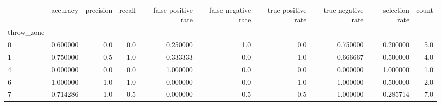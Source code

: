 \begin{tabular}{lrrrrrrrrr}
\toprule
{} &  accuracy &  precision &  recall &  false positive rate &  false negative rate &  true positive rate &  true negative rate &  selection rate &  count \\
throw\_zone &           &            &         &                      &                      &                     &                     &                 &        \\
\midrule
0          &  0.600000 &        0.0 &     0.0 &             0.250000 &                  1.0 &                 0.0 &            0.750000 &        0.200000 &    5.0 \\
1          &  0.750000 &        0.5 &     1.0 &             0.333333 &                  0.0 &                 1.0 &            0.666667 &        0.500000 &    4.0 \\
4          &  0.000000 &        0.0 &     0.0 &             1.000000 &                  0.0 &                 0.0 &            0.000000 &        1.000000 &    1.0 \\
6          &  1.000000 &        1.0 &     1.0 &             0.000000 &                  0.0 &                 1.0 &            1.000000 &        0.500000 &    2.0 \\
7          &  0.714286 &        1.0 &     0.5 &             0.000000 &                  0.5 &                 0.5 &            1.000000 &        0.285714 &    7.0 \\
\bottomrule
\end{tabular}
